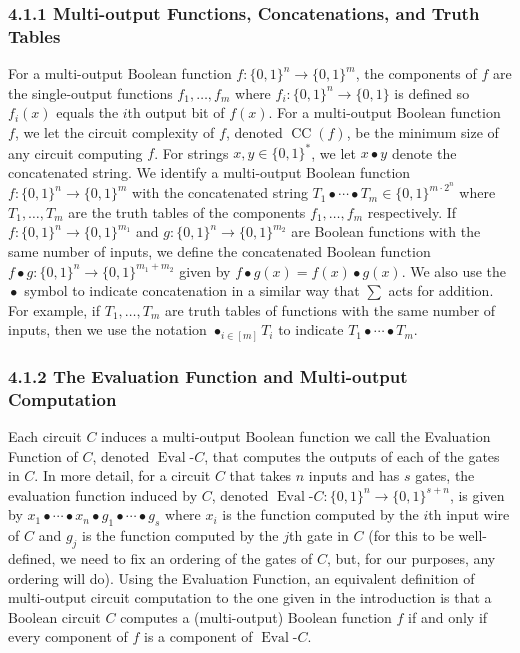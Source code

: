 \documentclass[10pt,a4paper]{article}
\newcommand{\CCirc}{\operatorname{CC}}
\begin{document}
\subsubsection*{4.1.1 Multi-output Functions, Concatenations, and Truth Tables}
For a multi-output Boolean function $f:\{0,1\}^n\to\{0,1\}^m$, the components of $f$ are the single-output functions $f_1,\ldots,f_m$ where $f_i:\{0,1\}^n\to\{0,1\}$ is defined so $f_i(x)$ equals the $i$th output bit of $f(x)$.
For a multi-output Boolean function $f$, we let the circuit complexity of $f$, denoted $\CCirc(f)$, be the minimum size of any circuit computing $f$.
For strings $x,y\in\{0,1\}^*$, we let $x\bullet y$ denote the concatenated string. We identify a multi-output Boolean function $f:\{0,1\}^n\to\{0,1\}^m$ with the concatenated string $T_1\bullet\cdots\bullet T_m\in\{0,1\}^{m\cdot2^n}$ where $T_1,\ldots,T_m$ are the truth tables of the components $f_1,\ldots,f_m$ respectively.
If $f:\{0,1\}^n\to\{0,1\}^{m_1}$ and $g:\{0,1\}^n\to\{0,1\}^{m_2}$ are Boolean functions with the same number of inputs, we define the concatenated Boolean function $f\bullet g:\{0,1\}^n\to\{0,1\}^{m_1+m_2}$ given by $f\bullet g(x)=f(x)\bullet g(x)$.
We also use the $\mathop{\bullet}$ symbol to indicate concatenation in a similar way that $\sum$ acts for addition. For example, if $T_1,\ldots,T_m$ are truth tables of functions with the same number of inputs, then we use the notation $\mathop{\bullet}_{i\in[m]}T_i$ to indicate $T_1\bullet\cdots\bullet T_m$.
\subsubsection*{4.1.2 The Evaluation Function and Multi-output Computation}
Each circuit $C$ induces a multi-output Boolean function we call the Evaluation Function of $C$, denoted $\operatorname{Eval}\text{-}C$, that computes the outputs of each of the gates in $C$. In more detail, for a circuit $C$ that takes $n$ inputs and has $s$ gates, the evaluation function induced by $C$, denoted $\operatorname{Eval}\text{-}C:\{0,1\}^n\to\{0,1\}^{s+n}$, is given by $x_1\bullet\cdots\bullet x_n\bullet g_1\bullet\cdots\bullet g_s$ where $x_i$ is the function computed by the $i$th input wire of $C$ and $g_j$ is the function computed by the $j$th gate in $C$ (for this to be well-defined, we need to fix an ordering of the gates of $C$, but, for our purposes, any ordering will do).
Using the Evaluation Function, an equivalent definition of multi-output circuit computation to the one given in the introduction is that a Boolean circuit $C$ computes a (multi-output) Boolean function $f$ if and only if every component of $f$ is a component of $\operatorname{Eval}\text{-}C$.
\end{document}
